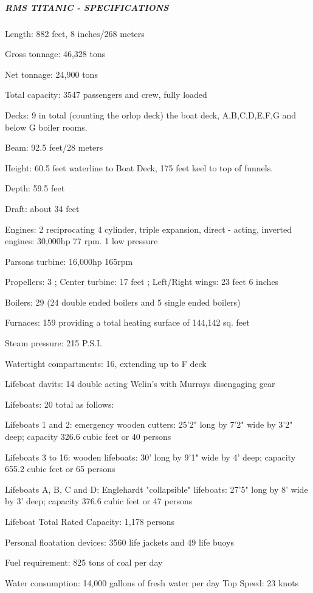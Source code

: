 \documentclass[11pt]{article}
\begin{document}
    \subparagraph{RMS TITANIC -
SPECIFICATIONS}\label{rms-titanic---specifications}

Length: 882 feet, 8 inches/268 meters

Gross tonnage: 46,328 tons

Net tonnage: 24,900 tons

Total capacity: 3547 passengers and crew, fully loaded

Decks: 9 in total (counting the orlop deck) the boat deck, A,B,C,D,E,F,G
and below G boiler rooms.

Beam: 92.5 feet/28 meters

Height: 60.5 feet waterline to Boat Deck, 175 feet keel to top of
funnels.

Depth: 59.5 feet

Draft: about 34 feet

Engines: 2 reciprocating 4 cylinder, triple expansion, direct - acting,
inverted engines: 30,000hp 77 rpm. 1 low pressure

Parsons turbine: 16,000hp 165rpm

Propellers: 3 ; Center turbine: 17 feet ; Left/Right wings: 23 feet 6
inches

Boilers: 29 (24 double ended boilers and 5 single ended boilers)

Furnaces: 159 providing a total heating surface of 144,142 sq. feet

Steam pressure: 215 P.S.I.

Watertight compartments: 16, extending up to F deck

Lifeboat davits: 14 double acting Welin's with Murrays disengaging gear

Lifeboats: 20 total as follows:

Lifeboats 1 and 2: emergency wooden cutters: 25'2" long by 7'2" wide by
3'2" deep; capacity 326.6 cubic feet or 40 persons

Lifeboats 3 to 16: wooden lifeboats: 30' long by 9'1" wide by 4' deep;
capacity 655.2 cubic feet or 65 persons

Lifeboats A, B, C and D: Englehardt "collapsible" lifeboats: 27'5" long
by 8' wide by 3' deep; capacity 376.6 cubic feet or 47 persons

Lifeboat Total Rated Capacity: 1,178 persons

Personal floatation devices: 3560 life jackets and 49 life buoys

Fuel requirement: 825 tons of coal per day

Water consumption: 14,000 gallons of fresh water per day Top Speed: 23
knots
\end{document}
